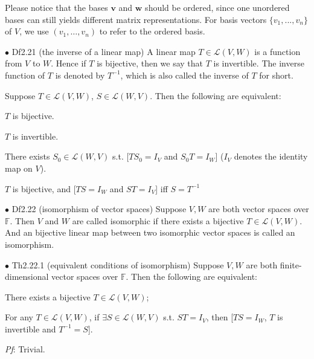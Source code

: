 \documentclass{article}
\begin{document}
\begin{Rmk}{}
    Please notice that the bases $\pmb{v}$ and $\pmb{w}$ should be ordered, since one unordered bases can still yields different matrix representations. \textcolor{Df}{For basis vectors $\{v_1, ..., v_n\}$ of $V$, we use $(v_1, \dots, v_n)$ to refer to the ordered basis.}
\end{Rmk}

\begin{Df}{$\bullet$ Df2.21 (the inverse of a linear map)}
    A linear map $T\in\mathcal{L}(V, W)$ is a function from $V$ to $W$. Hence if $T$ is bijective, then we say that $T$ is invertible. The inverse function of $T$ is denoted by $T^{-1}$, which is also called the inverse of $T$ for short.
\end{Df}

\begin{Rmk}{}
    \textcolor{Th}{Suppose $T\in\mathcal{L}(V, W)$, $S\in\mathcal{L}(W, V)$. Then the following are equivalent:
    \begin{compactenum}
        \item $T$ is bijective.
        \item $T$ is invertible.
        \item There exists $S_0\in\mathcal{L}(W, V)$ s.t. [$TS_0 = I_V$ and $S_0T = I_W$] ($I_V$ denotes the identity map on $V$).
        \item $T$ is bijective, and [$TS = I_W$ and $ST = I_V$] iff $S = T^{-1}$ 
    \end{compactenum}}
\end{Rmk}

\begin{Df}{$\bullet$ Df2.22 (isomorphism of vector spaces)}
    Suppose $V, W$ are both vector spaces over $\mathbb{F}$. Then $V$ and $W$ are called isomorphic if there exists a bijective $T\in\mathcal{L}(V, W)$. And an bijective linear map between two isomorphic vector spaces is called an isomorphism.
\end{Df}

\begin{Th}{$\bullet$ Th2.22.1 (equivalent conditions of isomorphism)}
    Suppose $V, W$ are both finite-dimensional vector spaces over $\mathbb{F}$. Then the following are equivalent:
    \begin{compactenum}
        \item There exists a bijective $T\in\mathcal{L}(V, W)$;
        \item For any $T\in\mathcal{L}(V, W)$, if $\exists S\in\mathcal{L}(W, V)$ s.t. $ST = I_V$, then [$TS = I_W$, $T$ is invertible and $T^{-1} = S$]. 
    \end{compactenum}
    \textit{Pf}: Trivial.
\end{Th}
\end{document}
